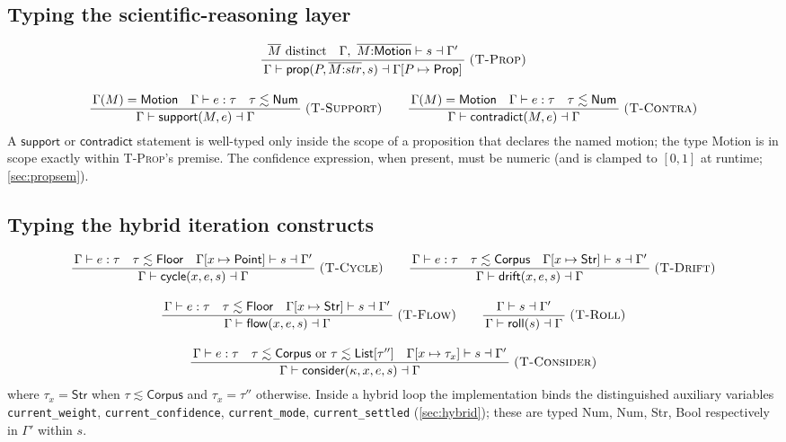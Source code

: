 \documentclass[11pt,a4paper]{article}
\theoremstyle{plain}
\theoremstyle{definition}
\theoremstyle{remark}
\newcommand{\rn}[1]{\textsc{#1}}                          %
\newcommand{\Unit}{[0,1]}
\newcommand{\Gam}{\Gamma}
\newcommand{\infrule}[3]{%
  \ensuremath{\displaystyle\frac{\,#2\,}{\,#3\,}}\;\rn{(#1)}}
\newcommand{\jspace}{\qquad}
\begin{document}
\subsection{Typing the scientific-reasoning layer}

\begin{gather*}
\infrule{T-Prop}{\overline{M}\ \text{distinct}\quad
                 \Gam,\ \overline{M{:}\mathsf{Motion}}\vdash s\dashv\Gam'}
                {\Gam\vdash\mathsf{prop}(P,\overline{M{:}str},s)\dashv
                 \Gam[P\mapsto\mathsf{Prop}]}\\[10pt]
\infrule{T-Support}{\Gam(M)=\mathsf{Motion}\quad
                    \Gam\vdash e:\tau\quad\tau\lesssim\mathsf{Num}}
                   {\Gam\vdash\mathsf{support}(M,e)\dashv\Gam}\jspace
\infrule{T-Contra}{\Gam(M)=\mathsf{Motion}\quad
                    \Gam\vdash e:\tau\quad\tau\lesssim\mathsf{Num}}
                   {\Gam\vdash\mathsf{contradict}(M,e)\dashv\Gam}
\end{gather*}
A $\mathsf{support}$ or $\mathsf{contradict}$ statement is well-typed only
inside the scope of a proposition that declares the named motion; the
type \textsf{Motion} is in scope exactly within \rn{T-Prop}'s premise. The
confidence expression, when present, must be numeric (and is clamped to
$\Unit$ at runtime; \cref{sec:propsem}).

\subsection{Typing the hybrid iteration constructs}

\begin{gather*}
\infrule{T-Cycle}{\Gam\vdash e:\tau\quad\tau\lesssim\mathsf{Floor}\quad
                  \Gam[x\mapsto\mathsf{Point}]\vdash s\dashv\Gam'}
                 {\Gam\vdash\mathsf{cycle}(x,e,s)\dashv\Gam}\jspace
\infrule{T-Drift}{\Gam\vdash e:\tau\quad\tau\lesssim\mathsf{Corpus}\quad
                  \Gam[x\mapsto\mathsf{Str}]\vdash s\dashv\Gam'}
                 {\Gam\vdash\mathsf{drift}(x,e,s)\dashv\Gam}\\[10pt]
\infrule{T-Flow}{\Gam\vdash e:\tau\quad\tau\lesssim\mathsf{Floor}\quad
                 \Gam[x\mapsto\mathsf{Str}]\vdash s\dashv\Gam'}
                {\Gam\vdash\mathsf{flow}(x,e,s)\dashv\Gam}\jspace
\infrule{T-Roll}{\Gam\vdash s\dashv\Gam'}
               {\Gam\vdash\mathsf{roll}(s)\dashv\Gam}\\[10pt]
\infrule{T-Consider}{\Gam\vdash e:\tau\quad\tau\lesssim\mathsf{Corpus}\
                     \text{or}\ \tau\lesssim\mathsf{List}[\tau'']\quad
                     \Gam[x\mapsto\tau_x]\vdash s\dashv\Gam'}
                    {\Gam\vdash\mathsf{consider}(\kappa,x,e,s)\dashv\Gam}
\end{gather*}
where $\tau_x=\mathsf{Str}$ when $\tau\lesssim\mathsf{Corpus}$ and
$\tau_x=\tau''$ otherwise. Inside a hybrid loop the implementation binds the
distinguished auxiliary variables \texttt{current\_weight},
\texttt{current\_confidence}, \texttt{current\_mode}, \texttt{current\_settled}
(\cref{sec:hybrid}); these are typed \textsf{Num}, \textsf{Num}, \textsf{Str},
\textsf{Bool} respectively in $\Gam'$ within $s$.
\end{document}
